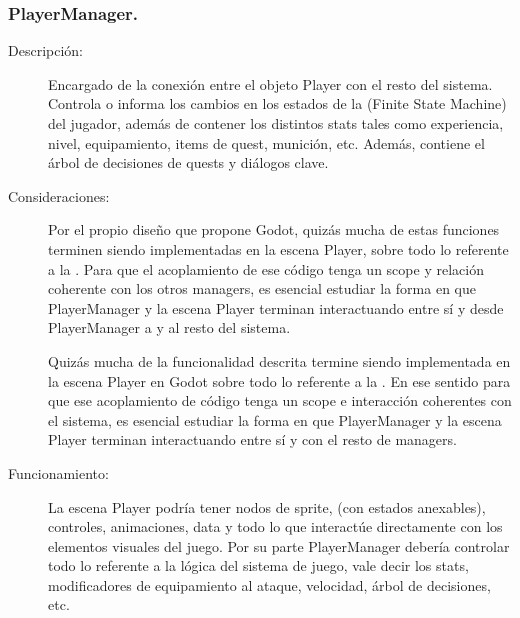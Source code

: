 \subsubsection{PlayerManager.}\label{modelado:playermanager}
\begin{description}
	\item[Descripción:] Encargado de la conexión entre el objeto Player con el resto del sistema. Controla o informa los cambios en los estados de la  (Finite State Machine) del jugador, además de contener los distintos stats tales como experiencia, nivel, equipamiento, items de quest, munición, etc. Además, contiene el árbol de decisiones de quests y diálogos clave.
	
	\item[Consideraciones:] Por el propio diseño que propone Godot, quizás mucha de estas funciones terminen siendo implementadas en la escena Player, sobre todo lo referente a la . Para que el acoplamiento de ese código tenga un scope y relación coherente con los otros managers, es esencial estudiar la forma en que PlayerManager y la escena Player terminan interactuando entre sí y desde PlayerManager a  y al resto del sistema.
	
	Quizás mucha de la funcionalidad descrita termine siendo implementada en la escena Player en Godot sobre todo lo referente a la . En ese sentido para que ese acoplamiento de código tenga un scope e interacción coherentes con el sistema, es esencial estudiar la forma en que PlayerManager y la escena Player terminan interactuando entre sí y con el resto de managers.
	
	\item[Funcionamiento:] La escena Player podría tener nodos de sprite,  (con estados anexables), controles, animaciones, data y todo lo que interactúe directamente con los elementos visuales del juego. Por su parte PlayerManager debería controlar todo lo referente a la lógica del sistema de juego, vale decir los stats, modificadores de equipamiento al ataque, velocidad, árbol de decisiones, etc.
\end{description}
	
